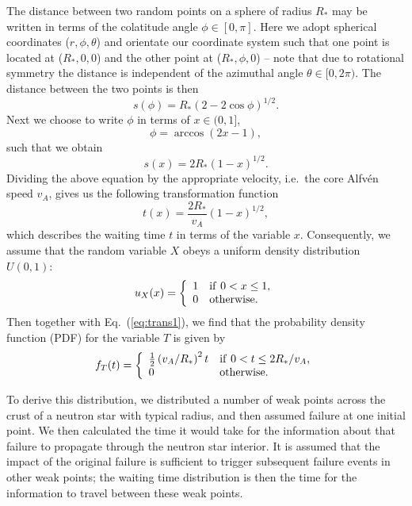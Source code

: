 \documentclass[12pt]{emulateapj}
\begin{document}
The distance between two random points on a sphere of radius $R_*$ may be written in terms of the colatitude angle $\phi\in[0,\pi]$. Here we adopt 
spherical coordinates ($r,\phi,\theta$) and orientate our coordinate system such that one point is located at ($R_*,0,0$) and the other point at ($R_*,\phi,0$) -- 
note that due to rotational symmetry the distance is independent of the azimuthal angle $\theta\in[0,2\pi)$. The distance between the two points is then
\begin{equation}\label{eq}
s(\phi)=R_*(2-2\cos\phi)^{1/2}.
\end{equation}
Next we choose to write $\phi$ in terms of $x\in(0,1]$,
\begin{equation}\label{eq:phi(x)}
\phi=\arccos(2x-1),
\end{equation}
such that we obtain
\begin{equation}\label{eq}
s(x)=2R_*(1-x)^{1/2}.
\end{equation}
Dividing the above equation by the appropriate velocity, i.e.\ the core Alfv\'en speed  $v_A$, gives us the following transformation function
\begin{equation}\label{eq:trans1}
t(x)=\frac{2R_*}{v_A}(1-x)^{1/2},
\end{equation}
which describes the waiting time $t$ in terms of the variable $x$. Consequently, we assume that the random variable $X$ obeys a uniform density distribution $U(0,1)$:
\begin{equation}\label{eq:uniform dist}
u_X(x) = \left\{
\begin{array}{ll}
1 &  {\rm if~} 0<x\leq1,\\
0 & {\rm otherwise}.
\end{array} \right.
\end{equation}
Then together with Eq.~(\ref{eq:trans1}), we find that the probability density function (PDF) for the variable $T$ is given by
\begin{equation}\label{eq:interior_pdf}
f_T(t) = \left\{
\begin{array}{ll}
\frac{1}{2}\left(v_A/R_*\right)^2t &  {\rm if~} 0<t\leq2R_*/v_A,\\
0 & {\rm otherwise}.
\end{array} \right.
\end{equation}

To derive this distribution, we distributed a number of weak points across the crust of a neutron star with typical radius, and then assumed failure at one 
initial point. We then calculated the time it would take for the information about that failure to propagate through the neutron star interior. It is assumed 
that the impact of the original failure is sufficient to trigger subsequent failure events in other weak points; the waiting time distribution is then the time 
for the information to travel between these weak points.
\end{document}

